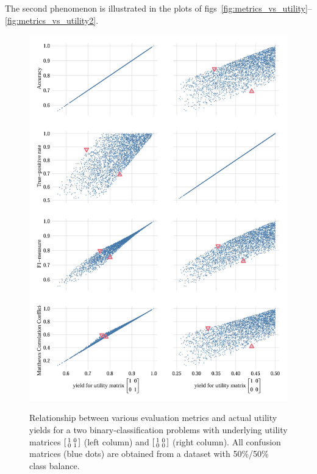 \documentclass[\ifafour a4paper,12pt,\else a5paper,10pt,\fi%
onecolumn,oneside,article,%
british%
]{memoir}
\theoremstyle{remark}
\theoremstyle{innote}
\renewcommand*{\|}[1][]{\nonscript\:#1\vert\nonscript\:\mathopen{}}
\newcommand*{\figs}{figs}%
\begin{document}
The second phenomenon is illustrated in the plots of \figs~\ref{fig:metrics_vs_utility}--\ref{fig:metrics_vs_utility2}.
\begin{figure}[p]
  \centering
\includegraphics[width=0.95\linewidth]{utility_vs_metrics2_0.5.jpg}\\%
\caption{Relationship between various evaluation metrics and actual utility yields for a  two binary-classification problems with underlying utility matrices $\begin{bsmallmatrix} 1&0\\0&1 \end{bsmallmatrix}$ (left column) and $\begin{bsmallmatrix} 1&0\\0&0 \end{bsmallmatrix}$ (right column). All confusion matrices ({\color{mypurpleblue}blue dots}) are obtained from a dataset with 50\%/50\% class balance.
}
\end{figure}
\end{document}
